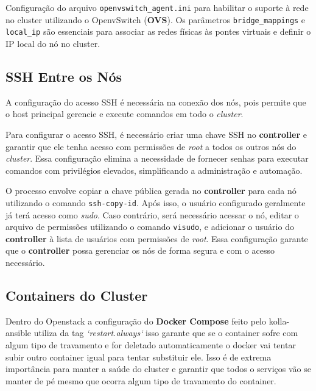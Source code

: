 \begin{listing}[h!]
    \noindent{}  
  \caption{Configuração do arquivo \texttt{openvswitch\_agent.ini} para habilitar o suporte à rede no cluster utilizando o OpenvSwitch (\textbf{OVS}). Os parâmetros \texttt{bridge\_mappings} e \texttt{local\_ip} são essenciais para associar as redes físicas às pontes virtuais e definir o IP local do nó no cluster.}
  \label{code:config_openvswitch}
\end{listing}

\subsection{SSH Entre os Nós}
A configuração do acesso SSH é necessária na conexão dos nós, pois permite que o host principal gerencie e execute comandos em todo o \textit{cluster}.

Para configurar o acesso SSH, é necessário criar uma chave SSH no \textbf{controller} e garantir que ele tenha acesso com permissões de \textit{root} a todos os outros nós do \textit{cluster}. Essa configuração elimina a necessidade de fornecer senhas para executar comandos com privilégios elevados, simplificando a administração e automação.

O processo envolve copiar a chave pública gerada no \textbf{controller} para cada nó utilizando o comando \texttt{ssh-copy-id}. Após isso, o usuário configurado geralmente já terá acesso como \textit{sudo}. Caso contrário, será necessário acessar o nó, editar o arquivo de permissões utilizando o comando \texttt{visudo}, e adicionar o usuário do \textbf{controller} à lista de usuários com permissões de \textit{root}. Essa configuração garante que o \textbf{controller} possa gerenciar os nós de forma segura e com o acesso necessário.


\subsection {Containers do Cluster}
Dentro do Openstack a configuração do \textbf{Docker Compose} feito pelo kolla-ansible utiliza da tag \textit{`restart.always`} isso garante que se o container sofre com algum tipo de travamento e for deletado automaticamente o docker vai tentar subir outro container igual para tentar substituir ele. Isso é de extrema importância para manter a saúde do cluster e garantir que todos o serviços vão se manter de pé mesmo que ocorra algum tipo de travamento do container.

